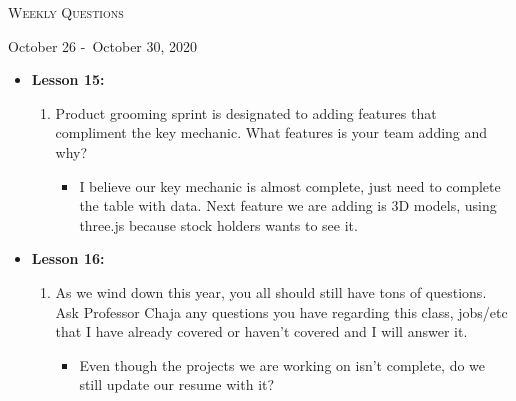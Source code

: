 \centerline{\LARGE\textsc{Weekly Questions}}
\centerline{October 26 -\ October 30, 2020}
\textbf{}
\begin{itemize}
  \item[] \textbf{\large Lesson 15:}
  \begin{enumerate}
    \item Product grooming sprint is designated to adding features that compliment the key mechanic. What features is your team adding and why?
    \begin{itemize}
      \item I believe our key mechanic is almost complete, just need to complete the table with data. Next feature we are adding is 3D models, using three.js because stock holders wants to see it.
    \end{itemize}
  \end{enumerate} 
\end{itemize}
\begin{itemize}
  \item[] \textbf{\large Lesson 16:}
  \begin{enumerate}
    \item As we wind down this year, you all should still have tons of questions. Ask Professor Chaja any questions you have regarding this class, jobs/etc that I have already covered or haven't covered and I will answer it.
    \begin{itemize}
      \item Even though the projects we are working on isn't complete, do we still update our resume with it?
    \end{itemize}
  \end{enumerate} 
\end{itemize}
